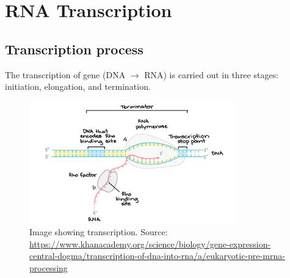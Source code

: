 \documentclass[letterpaper,12pt]{article}
\begin{document}
\newpage
\section{RNA Transcription}
\subsection{Transcription process}
The transcription of gene (DNA $\rightarrow$ RNA) is carried out in three stages: initiation, elongation, and termination.
\begin{figure}[!h]
	\centering
	\includegraphics[width=0.8\textwidth]{figures/transc_new.png}
	\caption{Image showing transcription. Source: \url{https://www.khanacademy.org/science/biology/gene-expression-central-dogma/transcription-of-dna-into-rna/a/eukaryotic-pre-mrna-processing}}\label{fig:transcription}
\end{figure}
\end{document}
